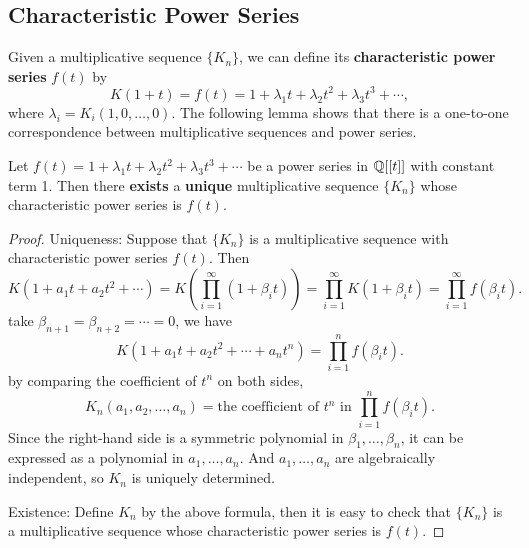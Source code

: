 \subsection{Characteristic Power Series}
Given a multiplicative sequence $\{K_n\}$, we can define its \textbf{characteristic power series} $f(t)$ by 
\begin{equation*}
    K(1 + t) = f(t) = 1 + \lambda_1 t + \lambda_2 t^2 + \lambda_3 t^3 + \cdots,
\end{equation*}
where $\lambda_i = K_i(1,0,\dots,0)$. The following lemma shows that there is a one-to-one correspondence 
between multiplicative sequences and power series.
\begin{lemma}[Hirzebruch]
    Let $f(t) = 1 + \lambda_1 t + \lambda_2 t^2 + \lambda_3 t^3 + \cdots$ be a power series in $\mathbb{Q}[[t]]$ with constant term 1. 
    Then there \textbf{exists} a \textbf{unique} multiplicative sequence $\{K_n\}$ whose characteristic power series is $f(t)$.
\end{lemma}
\begin{proof}
    Uniqueness: Suppose that $\{K_n\}$ is a multiplicative sequence with characteristic power series $f(t)$. 
    Then 
    \begin{equation*}
        K(1 + a_1 t + a_2 t^2 + \cdots) = K\left(\prod_{i=1}^{\infty} (1 + \beta_i t)\right) 
        = \prod_{i=1}^{\infty} K(1 + \beta_i t) = \prod_{i=1}^{\infty} f(\beta_i t).
    \end{equation*}
    take $\beta_{n+1} = \beta_{n+2} = \cdots = 0$, we have
    \begin{equation*}
        K(1 + a_1 t + a_2 t^2 + \cdots + a_n t^n) = \prod_{i=1}^{n} f(\beta_i t).
    \end{equation*}
    by comparing the coefficient of $t^n$ on both sides, 
    \begin{equation*}
        K_n(a_1,a_2,\dots,a_n) = \text{the coefficient of } t^n \text{ in } \prod_{i=1}^{n} f(\beta_i t).
    \end{equation*}
    Since the right-hand side is a symmetric polynomial in $\beta_1,\dots,\beta_n$, 
    it can be expressed as a polynomial in $a_1,\dots,a_n$. 
    And $a_1,\dots,a_n$ are algebraically independent, so $K_n$ is uniquely determined.

    Existence: Define $K_n$ by the above formula, then it is easy to check that $\{K_n\}$ is a multiplicative sequence
    whose characteristic power series is $f(t)$.
\end{proof}

